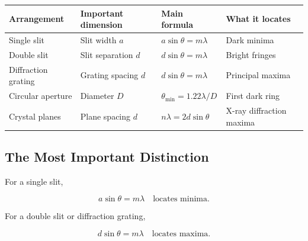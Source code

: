 \documentclass{studentnotes}
\begin{document}
\begin{center}
    \renewcommand{\arraystretch}{1.5}
    \begin{tabular}{
            >{\raggedright\arraybackslash}p{3.1cm}
            >{\centering\arraybackslash}p{2.7cm}
            >{\centering\arraybackslash}p{4.3cm}
            >{\raggedright\arraybackslash}p{3.2cm}
        }
        \toprule
        \textbf{Arrangement}
         &
        \textbf{Important dimension}
         &
        \textbf{Main formula}
         &
        \textbf{What it locates}
        \\
        \midrule

        Single slit
         &
        Slit width \(a\)
         &
        \(a\sin\theta=m\lambda\)
         &
        Dark minima
        \\

        Double slit
         &
        Slit separation \(d\)
         &
        \(d\sin\theta=m\lambda\)
         &
        Bright fringes
        \\

        Diffraction grating
         &
        Grating spacing \(d\)
         &
        \(d\sin\theta=m\lambda\)
         &
        Principal maxima
        \\

        Circular aperture
         &
        Diameter \(D\)
         &
        \(\theta_{\min}=1.22\lambda/D\)
         &
        First dark ring
        \\

        Crystal planes
         &
        Plane spacing \(d\)
         &
        \(n\lambda=2d\sin\theta\)
         &
        X-ray diffraction maxima
        \\

        \bottomrule
    \end{tabular}
\end{center}

\subsection{The Most Important Distinction}

For a single slit,

\[
    \boxed{
        a\sin\theta=m\lambda
        \quad\text{locates minima.}
    }
\]

For a double slit or diffraction grating,

\[
    \boxed{
        d\sin\theta=m\lambda
        \quad\text{locates maxima.}
    }
\]
\end{document}
